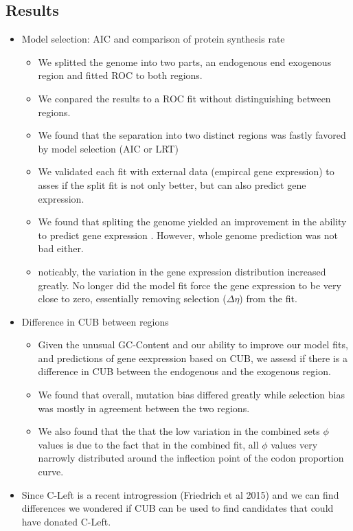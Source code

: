 \documentclass[12pt]{article}
\begin{document}
\subsection*{Results}
\begin{itemize}
	\item Model selection: AIC and comparison of protein synthesis rate 
	\begin{itemize}
		\item We splitted the genome into two parts, an endogenous end exogenous region and fitted ROC to both regions.
		\item We conpared the results to a ROC fit without distinguishing between regions.
		\item We found that the separation into two distinct regions was fastly favored by model selection (AIC or LRT)
		\item We validated each fit with external data (empircal gene expression) to asses if the split fit is not only better, but can also predict gene expression.
		\item We found that spliting the genome yielded an improvement in the ability to predict gene expression . However, whole genome prediction was not bad either.
		\item noticably, the variation in the gene expression distribution increased greatly. No longer did the model fit force the gene expression to be very close to zero, essentially removing selection ($\Delta \eta$) from the fit.
	\end{itemize}
	\item Difference in CUB between regions
	\begin{itemize}
		\item Given the unusual GC-Content and our ability to improve our model fits, and predictions of gene eexpression based on CUB, we assesd if there is a difference in CUB between the endogenous and the exogenous region.
		\item We found that overall, mutation bias differed greatly while selection bias was mostly in agreement between the two regions.
		\item We also found that the that the low variation in the combined sets $\phi$ values is due to the fact that in the combined fit, all $\phi$ values very narrowly distributed around the inflection point of the codon proportion curve.
	\end{itemize}
	\item Since C-Left is a recent introgression (Friedrich et al 2015) and we can find differences we wondered if CUB can be used to find candidates that could have donated C-Left.

\end{itemize}
\end{document}
